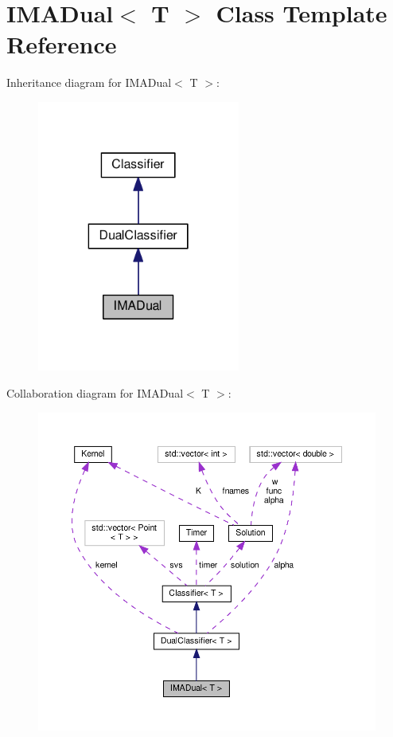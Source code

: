 \hypertarget{class_i_m_a_dual}{}\section{I\+M\+A\+Dual$<$ T $>$ Class Template Reference}
\label{class_i_m_a_dual}


Inheritance diagram for I\+M\+A\+Dual$<$ T $>$\+:
\nopagebreak
\begin{figure}[H]
\begin{center}
\leavevmode
\includegraphics[width=189pt]{class_i_m_a_dual__inherit__graph}
\end{center}
\end{figure}


Collaboration diagram for I\+M\+A\+Dual$<$ T $>$\+:
\nopagebreak
\begin{figure}[H]
\begin{center}
\leavevmode
\includegraphics[width=350pt]{class_i_m_a_dual__coll__graph}
\end{center}
\end{figure}
